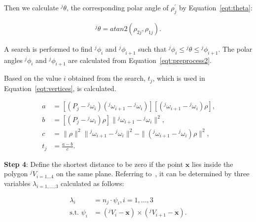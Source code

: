 Then we calculate ${^j\theta}$, the corresponding polar angle of $\rho^{\prime}_j$ by Equation~\ref{eqt:theta}:

\begin{equation}
\begin{aligned}
{^j\theta} = atan2 \left ( \rho_{2j},\rho_{1j} \right ) \mbox{.}
\end{aligned}
\label{eqt:theta}
\end{equation}

A search is performed to find ${^j\phi_i}$ and ${^j\phi_{i+1}}$ such that ${^j\phi_i} \leq {^j\theta} \leq {^j\phi_{i+1}}$.
The polar angles $^j\phi_i$ and ${^j\phi_{i+1}}$ are calculated from Equation~\ref{eqt:preprocess2}.


Based on the value $i$ obtained from the search, $t_j$, which is used in Equation~\ref{eqt:vertices}, is calculated.

\begin{equation}
\begin{aligned}
a &= [(P_j-{^j\omega}_i)({^j\omega}_{i+1}-{^j\omega}_i)][({^j\omega}_{i+1}-{^j\omega}_i)\rho] \mbox{,} \\
b &= [(P_j-{^j\omega}_i)\rho]\|{^j\omega}_{i+1}-{^j\omega}_i\|^2 \mbox{,} \\
c &= \|\rho\|^2\|{^j\omega}_{i+1}-{^j\omega}_i\|^2-\|({^j\omega}_{i+1}-{^j\omega}_i)\rho\|^2 \mbox{,} \\
t_j &= \frac{a-b}{c} \mbox{.}
\end{aligned}
\label{eqt:t}
\end{equation}

\noindent \textbf{Step 4}:
Define the shortest distance to be zero if the point $\textbf{x}$ lies inside the polygon $^jV_{i=1...4}$ on the same plane.
Referring to~\cite{preparata85}, it can be determined by three variables $\lambda_{i=1,...,3}$ calculated as follows:

\begin{equation}
\begin{aligned}
\lambda_i &= n_j \cdot \psi_i, i={1,...,3} \\
\mbox{s.t. } \psi_i &= (^jV_i-\textbf{x}) \times (^jV_{i+1}-\textbf{x}) \mbox{.}
\end{aligned}
\label{eqt:lamda}
\end{equation}

